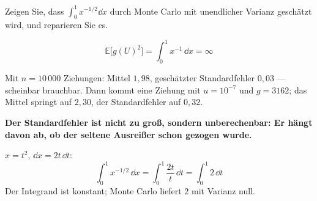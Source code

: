 \begin{aufgabe}
Zeigen Sie, dass $\int_0^1 x^{-1/2}\dd x$ durch Monte Carlo mit unendlicher Varianz geschätzt wird, und reparieren Sie es.

\loesung
{}
\[ \mathbb{E}\bigl[g(U)^{2}\bigr] = \int_0^1 x^{-1}\,\dd x = \infty \]

Mit $n = 10\,000$ Ziehungen: Mittel $1{,}98$, geschätzter Standardfehler $0{,}03$ --- scheinbar brauchbar. Dann kommt eine Ziehung mit $u = 10^{-7}$ und $g = 3162$; das Mittel springt auf $2{,}30$, der Standardfehler auf $0{,}32$.

\begin{center}
\begin{minipage}{0.9\textwidth}
\textbf{Der Standardfehler ist nicht zu groß, sondern unberechenbar: Er hängt davon ab, ob der seltene Ausreißer schon gezogen wurde.}
\end{minipage}
\end{center}

$x = t^{2}$, $\dd x = 2t\,\dd t$:
\[ \int_0^1 x^{-1/2}\,\dd x = \int_0^1 \frac{2t}{t}\,\dd t = \int_0^1 2\,\dd t \]
Der Integrand ist konstant; Monte Carlo liefert $2$ mit Varianz null.

\begin{center}
\begin{minipage}{0.88\textwidth}
\end{minipage}
\end{center}
\end{aufgabe}


